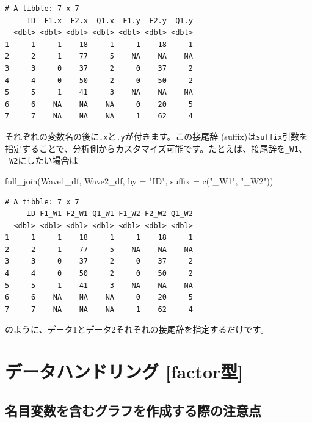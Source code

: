 \documentclass[
  a4paper,
  pandoc,
  ja=standard,
  jafont=haranoaji]{bxjsbook}
\newenvironment{Shaded}{\begin{snugshade}}{\end{snugshade}}
\newcommand{\AttributeTok}[1]{\textcolor[rgb]{0.00,0.48,0.65}{#1}}
\newcommand{\FunctionTok}[1]{\textcolor[rgb]{0.28,0.35,0.67}{#1}}
\newcommand{\NormalTok}[1]{\textcolor[rgb]{0.00,0.48,0.65}{#1}}
\newcommand{\StringTok}[1]{\textcolor[rgb]{0.13,0.47,0.30}{#1}}
\begin{document}
\begin{verbatim}
# A tibble: 7 x 7
     ID  F1.x  F2.x  Q1.x  F1.y  F2.y  Q1.y
  <dbl> <dbl> <dbl> <dbl> <dbl> <dbl> <dbl>
1     1     1    18     1     1    18     1
2     2     1    77     5    NA    NA    NA
3     3     0    37     2     0    37     2
4     4     0    50     2     0    50     2
5     5     1    41     3    NA    NA    NA
6     6    NA    NA    NA     0    20     5
7     7    NA    NA    NA     1    62     4
\end{verbatim}

それぞれの変数名の後に\texttt{.x}と\texttt{.y}が付きます。この接尾辞
(suffix)は\texttt{suffix}引数を指定することで、分析側からカスタマイズ可能です。たとえば、接尾辞を\texttt{\_W1}、\texttt{\_W2}にしたい場合は

\begin{Shaded}
\begin{Highlighting}[numbers=left,,]
\FunctionTok{full\_join}\NormalTok{(Wave1\_df, Wave2\_df, }\AttributeTok{by =} \StringTok{"ID"}\NormalTok{, }\AttributeTok{suffix =} \FunctionTok{c}\NormalTok{(}\StringTok{"\_W1"}\NormalTok{, }\StringTok{"\_W2"}\NormalTok{))}
\end{Highlighting}
\end{Shaded}

\begin{verbatim}
# A tibble: 7 x 7
     ID F1_W1 F2_W1 Q1_W1 F1_W2 F2_W2 Q1_W2
  <dbl> <dbl> <dbl> <dbl> <dbl> <dbl> <dbl>
1     1     1    18     1     1    18     1
2     2     1    77     5    NA    NA    NA
3     3     0    37     2     0    37     2
4     4     0    50     2     0    50     2
5     5     1    41     3    NA    NA    NA
6     6    NA    NA    NA     0    20     5
7     7    NA    NA    NA     1    62     4
\end{verbatim}

のように、データ1とデータ2それぞれの接尾辞を指定するだけです。

\hypertarget{sec-factor}{%
\chapter{データハンドリング {[}factor型{]}}\label{sec-factor}}

\hypertarget{ux540dux76eeux5909ux6570ux3092ux542bux3080ux30b0ux30e9ux30d5ux3092ux4f5cux6210ux3059ux308bux969bux306eux6ce8ux610fux70b9}{%
\section{名目変数を含むグラフを作成する際の注意点}\label{ux540dux76eeux5909ux6570ux3092ux542bux3080ux30b0ux30e9ux30d5ux3092ux4f5cux6210ux3059ux308bux969bux306eux6ce8ux610fux70b9}}
\end{document}
